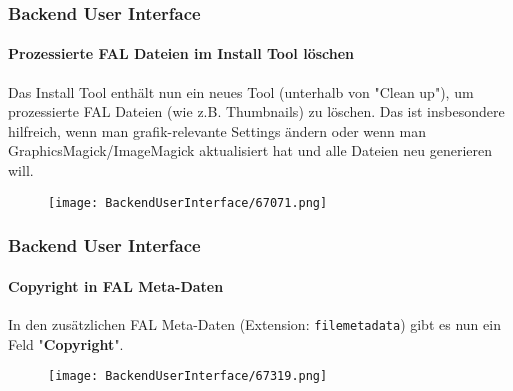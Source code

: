 \begin{frame}[fragile]
	\frametitle{Backend User Interface}
	\framesubtitle{Prozessierte FAL Dateien im Install Tool löschen}

	Das Install Tool enthält nun ein neues Tool (unterhalb von "Clean up"), um
	prozessierte FAL Dateien (wie z.B. Thumbnails) zu löschen. Das ist
	insbesondere hilfreich, wenn man grafik-relevante Settings ändern oder wenn
	man GraphicsMagick/ImageMagick aktualisiert hat und alle Dateien neu
	generieren will.

	\begin{figure}
		\texttt{[image: BackendUserInterface/67071.png]}
	\end{figure}

\end{frame}

\begin{frame}[fragile]
	\frametitle{Backend User Interface}
	\framesubtitle{Copyright in FAL Meta-Daten}

	In den zusätzlichen FAL Meta-Daten (Extension: \texttt{filemetadata}) gibt
	es nun ein Feld "\textbf{Copyright}".

	\begin{figure}
		\texttt{[image: BackendUserInterface/67319.png]}
	\end{figure}

\end{frame}

